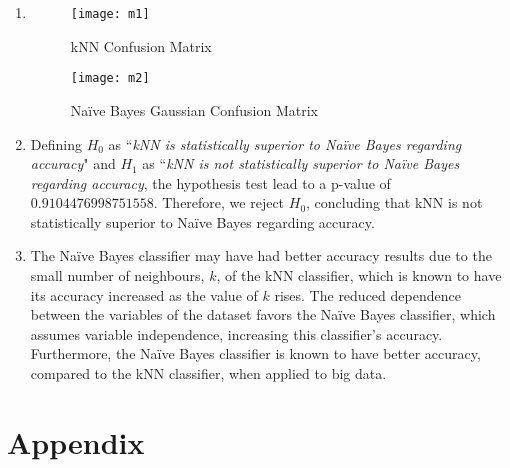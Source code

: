 \documentclass[12pt,a4paper]{article}
\begin{document}
\begin{enumerate}[resume]
	\item \mbox{}
	      \begin{figure}[h]
		      \texttt{[image: m1]}
		      \caption{kNN Confusion Matrix}

		      \texttt{[image: m2]}
		      \caption{Naïve Bayes Gaussian Confusion Matrix}
	      \end{figure}

	\item
	      Defining $H_0$ as ``\emph{kNN is statistically superior to Naïve Bayes
		      regarding accuracy}" and $H_1$ as ``\emph{kNN is not statistically
		      superior to Naïve Bayes regarding accuracy}, the hypothesis test lead
	      to a p-value of $0.9104476998751558$. Therefore, we reject $H_0$,
	      concluding that kNN is not statistically
	      superior to Naïve Bayes regarding accuracy.

	\item
	      The Naïve Bayes classifier may have had better accuracy results due
	      to the small number of neighbours, $k$, of the kNN classifier, which
	      is known to have its accuracy increased as the value of $k$ rises.
	      The reduced dependence between the variables of the dataset favors
	      the Naïve Bayes classifier, which assumes variable independence,
	      increasing this classifier's accuracy. Furthermore, the Naïve Bayes
	      classifier is known to have better accuracy, compared to the kNN
	      classifier, when applied to big data.

\end{enumerate}

\pagebreak

\section{Appendix}

\end{document}
